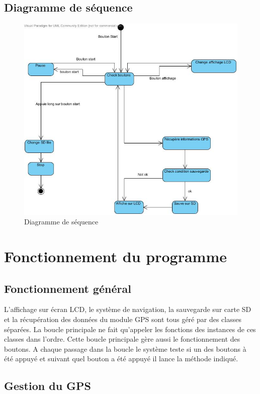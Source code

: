 \documentclass[a4paper,12pt,titlepage]{article}
\begin{document}
\subsection{Diagramme de séquence}

\begin{figure}[H]
	\centering
	\includegraphics[width=\textwidth]{sequence.jpg}
	\caption{Diagramme de séquence}
	\label{sequence}
\end{figure}

\section{Fonctionnement du programme}

\subsection{Fonctionnement général}

L'affichage sur écran LCD, le système de navigation, la sauvegarde sur carte SD et la récupération des données du module GPS sont tous géré par des classes séparées.
La boucle principale ne fait qu'appeler les fonctions des instances de ces classes dans l'ordre. Cette boucle principale gère aussi le fonctionnement des boutons.
A chaque passage dans la boucle le système teste si un des boutons à été appuyé et suivant quel bouton a été appuyé il lance la méthode indiqué.

\subsection{Gestion du GPS}
\end{document}

